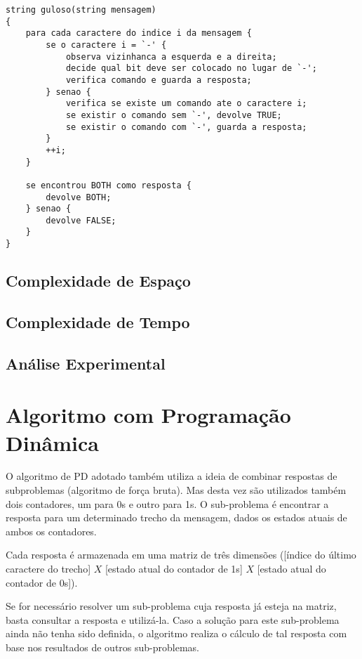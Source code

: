 \documentclass[a4paper,12pt,titlepage]{article}
\begin{document}
\begin{lstlisting}[caption=Algoritmo Guloso]
string guloso(string mensagem)
{
    para cada caractere do indice i da mensagem {
        se o caractere i = `-' {
            observa vizinhanca a esquerda e a direita;
            decide qual bit deve ser colocado no lugar de `-';
            verifica comando e guarda a resposta;
        } senao {
            verifica se existe um comando ate o caractere i;
            se existir o comando sem `-', devolve TRUE;
            se existir o comando com `-', guarda a resposta;
        }
        ++i;
    }
    
    se encontrou BOTH como resposta {
        devolve BOTH;
    } senao {
        devolve FALSE;
    }
}
\end{lstlisting}

\subsection{Complexidade de Espaço}
\subsection{Complexidade de Tempo}
\subsection{Análise Experimental}

\section{Algoritmo com Programação Dinâmica}

O algoritmo de PD adotado também utiliza a ideia de combinar respostas de subproblemas (algoritmo de força bruta). Mas desta vez são utilizados também dois contadores, um para 0s e outro para 1s. O sub-problema é encontrar a resposta para um determinado trecho da mensagem, dados os estados atuais de ambos os contadores. 

Cada resposta é armazenada em uma matriz de três dimensões ([índice do último caractere do trecho] $X$ [estado atual do contador de 1s] $X$ [estado atual do contador de 0s]).

Se for necessário resolver um sub-problema cuja resposta já esteja na matriz, basta consultar a resposta e utilizá-la. Caso a solução para este sub-problema ainda não tenha sido definida, o algoritmo realiza o cálculo de tal resposta com base nos resultados de outros sub-problemas. \ \\
\end{document}
